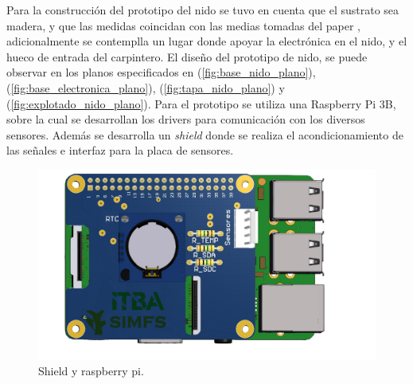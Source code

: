 %

Para la construcción del prototipo del nido se tuvo en cuenta que el sustrato sea madera, y que las medidas coincidan con las medias tomadas del paper \cite{ref:varepsilon_madera}, adicionalmente se contemplla un lugar donde apoyar la electrónica en el nido, y el hueco de entrada del carpintero.
El diseño del prototipo de nido, se puede observar en los planos especificados en (\ref{fig:base_nido_plano}), (\ref{fig:base_electronica_plano}), (\ref{fig:tapa_nido_plano}) y (\ref{fig:explotado_nido_plano}).
Para el prototipo se utiliza una Raspberry Pi 3B, sobre la cual se desarrollan los drivers para comunicación con los diversos sensores. Además se desarrolla un \textit{shield}  donde se realiza el acondicionamiento de las señales e interfaz para la placa de sensores.

\begin{figure}[H]
	\centering
	\includegraphics[width=0.9\linewidth,page=1]{ImagenesConstruccion del prototipo/shieldSensor}		
	\caption{Shield  y raspberry pi.}
	\label{fig:shield}
\end{figure}

